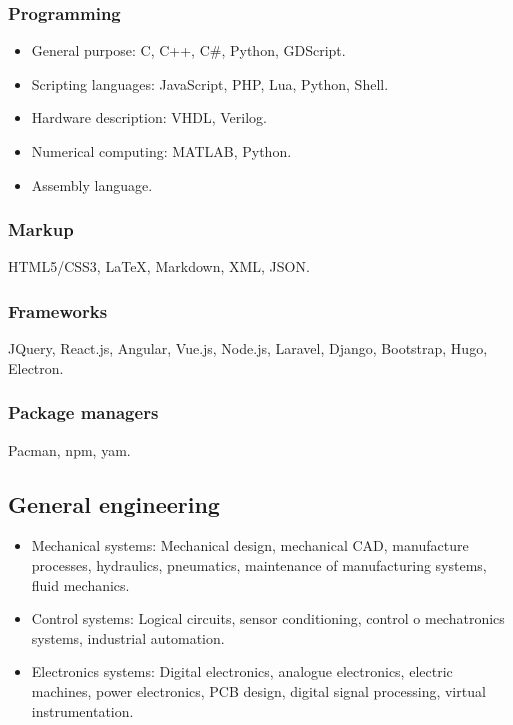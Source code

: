 \documentclass{article}
\begin{document}
    \subsubsection{Programming}

    \begin{itemize}
      \item General purpose: C, C++, C\#, Python, GDScript.
      \item Scripting languages: JavaScript, PHP, Lua, Python, Shell.
      \item Hardware description: VHDL, Verilog.
      \item Numerical computing: MATLAB, Python.
      \item Assembly language.
    \end{itemize}

    \subsubsection{Markup}

    HTML5/CSS3, {\LaTeX}, Markdown, XML, JSON.

    \subsubsection{Frameworks}

    JQuery, React.js, Angular, Vue.js, Node.js, Laravel, Django, Bootstrap, Hugo, Electron.

    \subsubsection{Package managers}

    Pacman, npm, yam.

    \subsection{General engineering}
    \begin{itemize}
      \item Mechanical systems: Mechanical design, mechanical CAD, manufacture processes, hydraulics, pneumatics, maintenance of manufacturing systems, fluid mechanics.
      \item Control systems: Logical circuits, sensor conditioning, control o mechatronics systems, industrial automation.
      \item Electronics systems: Digital electronics, analogue electronics, electric machines, power electronics, PCB design, digital signal processing, virtual instrumentation.
    \end{itemize}
\end{document}
